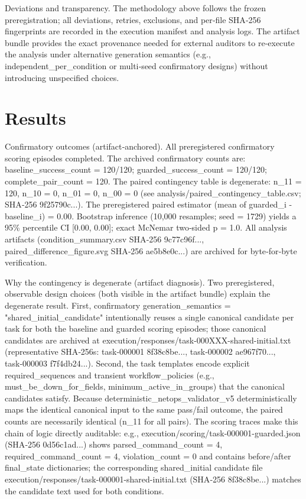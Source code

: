 \documentclass[conference]{IEEEtran}
\begin{document}
Deviations and transparency. The methodology above follows the frozen preregistration; all deviations, retries, exclusions, and per‑file SHA‑256 fingerprints are recorded in the execution manifest and analysis logs. The artifact bundle provides the exact provenance needed for external auditors to re‑execute the analysis under alternative generation semantics (e.g., independent\_per\_condition or multi‑seed confirmatory designs) without introducing unspecified choices.

\section{Results}
Confirmatory outcomes (artifact‑anchored). All preregistered confirmatory scoring episodes completed. The archived confirmatory counts are: baseline\_success\_count = 120/120; guarded\_success\_count = 120/120; complete\_pair\_count = 120. The paired contingency table is degenerate: n\_11 = 120, n\_10 = 0, n\_01 = 0, n\_00 = 0 (see analysis/paired\_contingency\_table.csv; SHA‑256 9f25790c...). The preregistered paired estimator (mean of guarded\_i - baseline\_i) = 0.00. Bootstrap inference (10,000 resamples; seed = 1729) yields a 95\% percentile CI [0.00, 0.00]; exact McNemar two‑sided p = 1.0. All analysis artifacts (condition\_summary.csv SHA‑256 9c77c96f..., paired\_difference\_figure.svg SHA‑256 ae5b8e0c...) are archived for byte‑for‑byte verification.

Why the contingency is degenerate (artifact diagnosis). Two preregistered, observable design choices (both visible in the artifact bundle) explain the degenerate result. First, confirmatory generation\_semantics = "shared\_initial\_candidate" intentionally reuses a single canonical candidate per task for both the baseline and guarded scoring episodes; those canonical candidates are archived at execution/responses/task-000XXX-shared-initial.txt (representative SHA‑256s: task‑000001 8f38c8be..., task‑000002 ae967f70..., task‑000003 f7f4db24...). Second, the task templates encode explicit required\_sequences and transient workflow\_policies (e.g., must\_be\_down\_for\_fields, minimum\_active\_in\_groups) that the canonical candidates satisfy. Because deterministic\_netops\_validator\_v5 deterministically maps the identical canonical input to the same pass/fail outcome, the paired counts are necessarily identical (n\_11 for all pairs). The scoring traces make this chain of logic directly auditable: e.g., execution/scoring/task-000001-guarded.json (SHA‑256 0d56c1ad...) shows parsed\_command\_count = 4, required\_command\_count = 4, violation\_count = 0 and contains before/after final\_state dictionaries; the corresponding shared\_initial candidate file execution/responses/task-000001-shared-initial.txt (SHA‑256 8f38c8be...) matches the candidate text used for both conditions.
\end{document}
